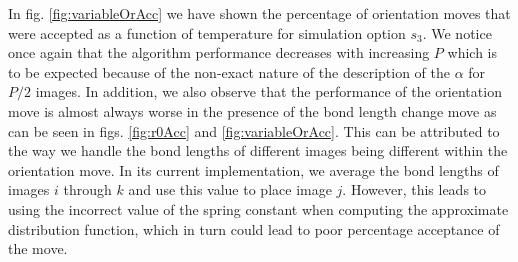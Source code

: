                 In fig. \ref{fig:variableOrAcc} we have shown the percentage of orientation moves that were accepted as a function of temperature for simulation option $s_3$. We notice once again that the algorithm performance decreases with increasing $P$ which is to be expected because of the non-exact nature of the description of the $\alpha$ for $P/2$ images. In addition, we also observe that the performance of the orientation move is almost always worse in the presence of the bond length change move as can be seen in figs. \ref{fig:r0Acc} and \ref{fig:variableOrAcc}. This can be attributed to the way we handle the bond lengths of different images being different within the orientation move. In its current implementation, we average the bond lengths of images $i$ through $k$ and use this value to place image $j$. However, this leads to using the incorrect value of the spring constant when computing the approximate distribution function, which in turn could lead to poor percentage acceptance of the move.

